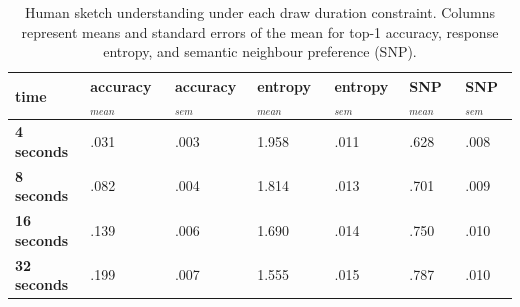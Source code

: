 \documentclass{article}
\begin{document}
\begin{table}[t!!]
    \centering
    \begin{tabular}{l|l|l||l|l||l|l}
    time & accuracy$_{mean}$ & accuracy$_{sem}$& entropy$_{mean}$ & entropy$_{sem}$& SNP$_{mean}$ & SNP$_{sem}$\\
    \toprule
        \textbf{4 seconds} & .031 & .003 & 1.958 & .011 & .628  & .008\\
        \textbf{8 seconds} & .082 & .004 & 1.814 & .013 & .701 & .009\\
        \textbf{16 seconds} & .139 & .006 & 1.690 & .014 & .750 & .010\\
        \textbf{32 seconds} & .199 & .007 & 1.555 & .015 & .787 & .010\\
        \bottomrule
      
    \end{tabular}\\\
    \caption{Human sketch understanding under each draw duration constraint. Columns represent means and standard errors of the mean for top-1 accuracy, response entropy, and semantic neighbour preference (SNP).}
    \vspace{-2em}
    \label{tab:human_performance}
\end{table}
\end{document}
